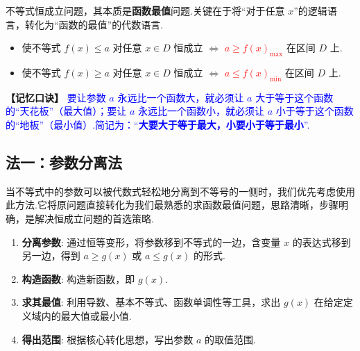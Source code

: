 \begin{theorem}[恒成立问题的核心转化思想]
	不等式恒成立问题，其本质是\textbf{函数最值}问题.关键在于将“对于任意 $x$”的逻辑语言，转化为“函数的最值”的代数语言.
	\begin{itemize}
		\item 使不等式 $f(x) \le a$ 对任意 $x \in D$ 恒成立 $\iff$ \textcolor{red}{$a \ge f(x)_{\text{max}}$} 在区间 $D$ 上.
		\item 使不等式 $f(x) \ge a$ 对任意 $x \in D$ 恒成立 $\iff$ \textcolor{red}{$a \le f(x)_{\text{min}}$} 在区间 $D$ 上.
	\end{itemize}
	\textbf{【记忆口诀】} \textcolor{blue}{要让参数 $a$ 永远比一个函数大，就必须让 $a$ 大于等于这个函数的“天花板”（最大值）；要让 $a$ 永远比一个函数小，就必须让 $a$ 小于等于这个函数的“地板”（最小值）.简记为：“\textbf{大要大于等于最大，小要小于等于最小}”.}
\end{theorem}

\subsection{法一：参数分离法}

\begin{definition}[参数分离法]
	当不等式中的参数可以被代数式轻松地分离到不等号的一侧时，我们优先考虑使用此方法.它将原问题直接转化为我们最熟悉的求函数最值问题，思路清晰，步骤明确，是解决恒成立问题的首选策略.
\end{definition}

\begin{note}[核心步骤]
	\begin{enumerate}
		\item \textbf{分离参数}: 通过恒等变形，将参数移到不等式的一边，含变量 $x$ 的表达式移到另一边，得到 $a \ge g(x)$ 或 $a \le g(x)$ 的形式.
		\item \textbf{构造函数}: 构造新函数，即 $g(x)$.
		\item \textbf{求其最值}: 利用导数、基本不等式、函数单调性等工具，求出 $g(x)$ 在给定定义域内的最大值或最小值.
		\item \textbf{得出范围}: 根据核心转化思想，写出参数 $a$ 的取值范围.
	\end{enumerate}
\end{note}

